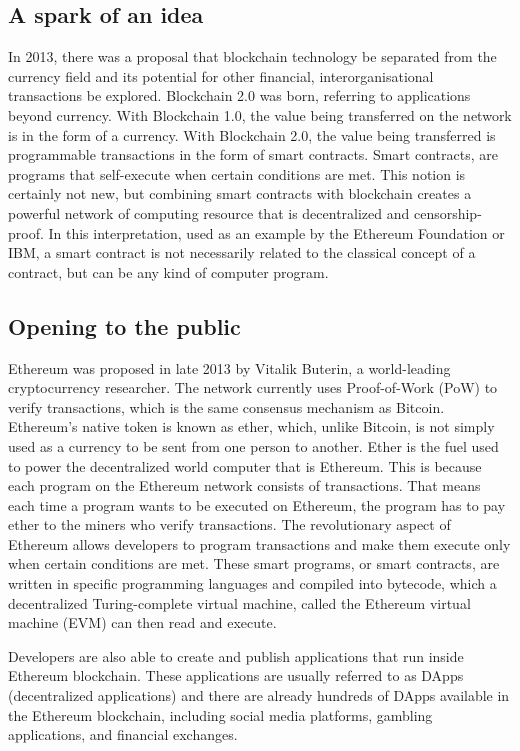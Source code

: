 \documentclass[a4paper]{article}
\begin{document}
	\subsection{A spark of an idea}
	In 2013, there was a proposal that blockchain technology be separated from the currency field and its potential for other financial, interorganisational transactions be explored. Blockchain 2.0 was born, referring to applications beyond currency. With Blockchain 1.0, the value being transferred on the network is in the form of a currency. With Blockchain 2.0, the value being transferred is programmable transactions in the form of smart contracts. Smart contracts, are programs that self-execute when certain conditions are met.\cite{morris2014bitcoin}\cite{schulpenrubenr.w.h.g.2018} This notion is certainly not new, but combining smart contracts with blockchain creates a powerful network of computing resource that is decentralized and censorship-proof. In this interpretation, used as an example by the Ethereum Foundation\cite{ethwp} or IBM\cite{cachin2016architecture}, a smart contract is not necessarily related to the classical concept of a contract, but can be any kind of computer program.
	
	\subsection{Opening to the public}
	Ethereum was proposed in late 2013 by Vitalik Buterin, a world-leading cryptocurrency researcher.\cite{ethwp} The network currently uses Proof-of-Work (PoW) to verify transactions, which is the same consensus mechanism as Bitcoin. Ethereum’s native token is known as ether, which, unlike Bitcoin, is not simply used as a currency to be sent from one person to another. Ether is the fuel used to power the decentralized world computer that is Ethereum. This is because each program on the Ethereum network consists of transactions. That means each time a program wants to be executed on Ethereum, the program has to pay ether to the miners who verify transactions. The revolutionary aspect of Ethereum allows developers to program transactions and make them execute only when certain conditions are met. These smart programs, or smart contracts, are written in specific programming languages and compiled into bytecode, which a decentralized Turing-complete virtual machine, called the Ethereum virtual machine (EVM) can then read and execute.
	
	Developers are also able to create and publish applications that run inside Ethereum blockchain. These applications are usually referred to as DApps (decentralized applications) and there are already hundreds of DApps available in the Ethereum blockchain, including social media platforms, gambling applications, and financial exchanges.
	
\end{document}
